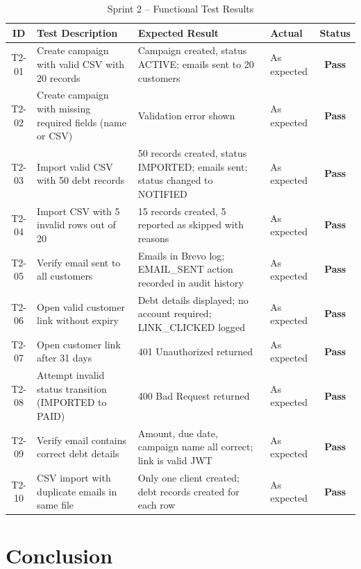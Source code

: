 \documentclass[12pt,a4paper]{report}
\newcommand{\tpass}{\textcolor{passgreen}{\textbf{Pass}}}
\begin{document}
\begin{table}[H]
  \centering
  \renewcommand{\arraystretch}{1.3}
  \begin{tabular}{|c|p{5cm}|p{4cm}|p{2cm}|c|}
    \hline
    \textbf{ID} & \textbf{Test Description} & \textbf{Expected Result} & \textbf{Actual} & \textbf{Status} \\
    \hline
    T2-01 & Create campaign with valid CSV with 20 records & Campaign created, status ACTIVE; emails sent to 20 customers & As expected & \tpass \\
    \hline
    T2-02 & Create campaign with missing required fields (name or CSV) & Validation error shown & As expected & \tpass \\
    \hline
    T2-03 & Import valid CSV with 50 debt records & 50 records created, status IMPORTED; emails sent; status changed to NOTIFIED & As expected & \tpass \\
    \hline
    T2-04 & Import CSV with 5 invalid rows out of 20 & 15 records created, 5 reported as skipped with reasons & As expected & \tpass \\
    \hline
    T2-05 & Verify email sent to all customers & Emails in Brevo log; EMAIL\_SENT action recorded in audit history & As expected & \tpass \\
    \hline
    T2-06 & Open valid customer link without expiry & Debt details displayed; no account required; LINK\_CLICKED logged & As expected & \tpass \\
    \hline
    T2-07 & Open customer link after 31 days & 401 Unauthorized returned & As expected & \tpass \\
    \hline
    T2-08 & Attempt invalid status transition (IMPORTED to PAID) & 400 Bad Request returned & As expected & \tpass \\
    \hline
    T2-09 & Verify email contains correct debt details & Amount, due date, campaign name all correct; link is valid JWT & As expected & \tpass \\
    \hline
    T2-10 & CSV import with duplicate emails in same file & Only one client created; debt records created for each row & As expected & \tpass \\
    \hline
  \end{tabular}
  \caption{Sprint 2 -- Functional Test Results}
  \label{tab:test-s2}
\end{table}

\section*{Conclusion}
{}
\end{document}
